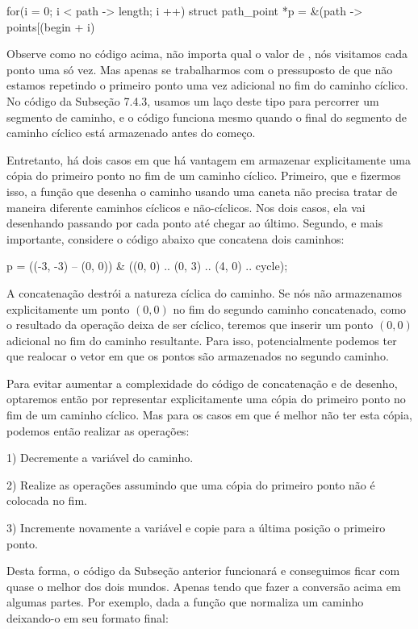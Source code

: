 \alinhaverbatim
for(i = 0; i < path -> length; i ++)
  struct path_point *p = &(path -> points[(begin + i) %
\alinhanormal

Observe como no código acima, não importa qual o valor
de , nós visitamos cada ponto uma só vez. Mas apenas
se trabalharmos com o pressuposto de que não estamos repetindo o
primeiro ponto uma vez adicional no fim do caminho cíclico. No código
da Subseção 7.4.3, usamos um laço deste tipo para percorrer um
segmento de caminho, e o código funciona mesmo quando o final do
segmento de caminho cíclico está armazenado antes do começo.

Entretanto, há dois casos em que há vantagem em armazenar
explicitamente uma cópia do primeiro ponto no fim de um caminho
cíclico. Primeiro, que e fizermos isso, a função que desenha o caminho
usando uma caneta não precisa tratar de maneira diferente caminhos
cíclicos e não-cíclicos. Nos dois casos, ela vai desenhando passando
por cada ponto até chegar ao último. Segundo, e mais importante,
considere o código abaixo que concatena dois caminhos:

\alinhaverbatim
p = ((-3, -3) -- (0, 0)) & ((0, 0) .. (0, 3) .. (4, 0) .. cycle);
\alinhanormal

A concatenação destrói a natureza cíclica do caminho. Se nós não
armazenamos explicitamente um ponto $(0, 0)$ no fim do segundo caminho
concatenado, como o resultado da operação deixa de ser cíclico,
teremos que inserir um ponto $(0, 0)$ adicional no fim do caminho
resultante. Para isso, potencialmente podemos ter que realocar o vetor
em que os pontos são armazenados no segundo caminho.

Para evitar aumentar a complexidade do código de concatenação e de
desenho, optaremos então por representar explicitamente uma cópia do
primeiro ponto no fim de um caminho cíclico. Mas para os casos em que
é melhor não ter esta cópia, podemos então realizar as operações:

1) Decremente a variável  do caminho.

2) Realize as operações assumindo que uma cópia do primeiro ponto não
é colocada no fim.

3) Incremente novamente a variável  e copie para a
última posição o primeiro ponto.

Desta forma, o código da Subseção anterior funcionará e conseguimos
ficar com quase o melhor dos dois mundos. Apenas tendo que fazer a
conversão acima em algumas partes. Por exemplo, dada a função que
normaliza um caminho deixando-o em seu formato final:

